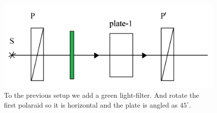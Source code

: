 \begin{minipage}{0.55\textwidth}
    \begin{figure}[h]
    \centering
    \includegraphics[width=1\textwidth]{images/greeeeeen.png}
    \caption{To the previous setup we add a green light-filter. And rotate the first polaraid so it is horizontal and the plate is  angled as $45^\circ$.}
\end{figure}
\end{minipage}
\hfill
\begin{minipage}{0.35\textwidth}
    
\end{minipage}
